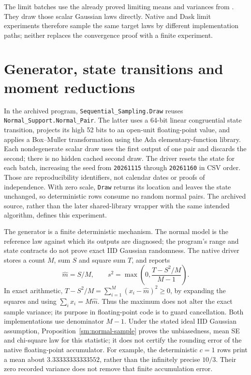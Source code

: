 The limit batches use the already proved limiting means and variances
from . They draw those scalar Gaussian laws
directly. Native and Dask limit experiments therefore sample the same
target laws by different implementation paths; neither replaces the
convergence proof with a finite experiment.

\section{Generator, state transitions and moment reductions}
In the archived program, \texttt{Sequential\_Sampling.Draw} reuses
\texttt{Normal\_Support.Normal\_Pair}. The latter uses a 64-bit linear
congruential state transition, projects its high 52 bits to an open-unit
floating-point value, and applies a Box--Muller transformation using the
Ada elementary-function library. Each nondegenerate scalar draw uses
the first output of one pair and discards the second; there is no hidden
cached second draw. The driver resets the state for each batch, increasing
the seed from \texttt{20261115} through \texttt{20261160} in CSV order.
Those are reproducibility identifiers, not calendar dates or proofs of
independence. With zero scale, \texttt{Draw} returns its location and
leaves the state unchanged, so deterministic rows consume no random
normal pairs. The archived source, rather than the later shared-library
wrapper with the same intended algorithm, defines this experiment.

The generator is a finite deterministic mechanism. The normal model is
the reference law against which its outputs are diagnosed; the program's
range and state contracts do not prove exact IID Gaussian randomness.
The native driver stores a count \(M\), sum \(S\) and square sum
\(T\), and reports
\[
 \widehat m=S/M,\qquad
 s^2=\max\left(0,\frac{T-S^2/M}{M-1}\right).
\]
In exact arithmetic,
\(T-S^2/M=\sum_{i=1}^{M}(x_i-\widehat m)^2\geq0\), by expanding
the squares and using \(\sum_i x_i=M\widehat m\). Thus the maximum
does not alter the exact sample variance; its purpose in floating-point
code is to guard cancellation. Both implementations use denominator
\(M-1\). Under the stated ideal IID Gaussian assumption,
Proposition~\ref{sm:normal-sample} proves the unbiasedness, mean SE and
chi-square law for this statistic; it does not certify the rounding error
of the native floating-point accumulator. For example, the deterministic
\(c=1\) rows print a mean about
\(3.33333333333552\), rather than the infinitely precise \(10/3\).
Their zero recorded variance does not remove that finite accumulation
error.

